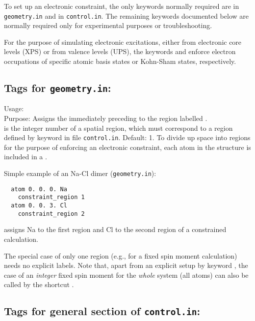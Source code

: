 To set up an electronic constraint, the only keywords normally
required are  in \texttt{geometry.in} and
 in \texttt{control.in}. The remaining
keywords documented below are normally required only for experimental
purposes or troubleshooting.

For the purpose of simulating electronic excitations, either from 
electronic core levels (XPS) or from valence levels (UPS), the keywords 
 and 
enforce electron occupations of specific atomic basis states or Kohn-Sham states, 
respectively.

\newpage

\subsection*{Tags for \texttt{geometry.in}:}

{
  \noindent
  Usage:   \\[1.0ex]
  Purpose: Assigns the immediately preceding  to the
    region labelled . \\[1.0ex]
   is the integer number of a spatial region, which
    must correspond to a region defined by keyword
     in file
    \texttt{control.in}. Default: 1.
}
To divide up space into regions for the purpose of enforcing an
electronic constraint, each atom in the structure is included in a 
.

Simple example of an Na-Cl dimer (\texttt{geometry.in}):
\begin{verbatim}
  atom 0. 0. 0. Na
    constraint_region 1
  atom 0. 0. 3. Cl
    constraint_region 2
\end{verbatim}
assigns Na to the first region and Cl to the second region of a constrained calculation.

The special case of only one region (e.g., for a fixed spin moment
calculation) needs no explicit 
labels. Note that, apart from an explicit setup by keyword
, the case of an \emph{integer} fixed
spin moment for the \emph{whole} system (all atoms) can also be called
by the shortcut . 

\newpage

\subsection*{Tags for general section of \texttt{control.in}:}

